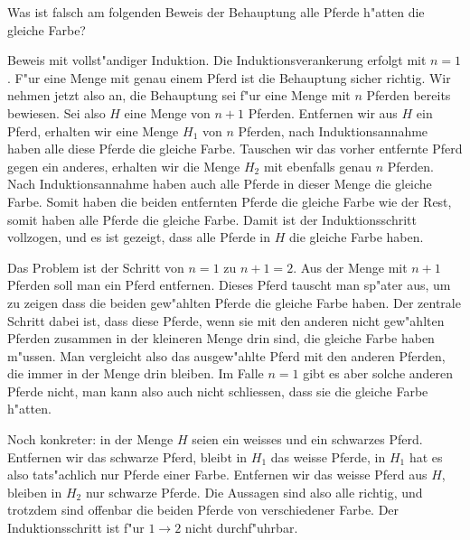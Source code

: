 Was ist falsch am folgenden Beweis der Behauptung alle Pferde h"atten die
gleiche Farbe?

Beweis mit vollst"andiger Induktion. Die Induktionsverankerung
erfolgt mit $n=1$. F"ur eine Menge mit genau einem Pferd ist
die Behauptung sicher richtig. Wir nehmen jetzt also an, die
Behauptung sei f"ur eine Menge mit $n$ Pferden bereits bewiesen.
Sei also $H$ eine Menge von $n+1$ Pferden. Entfernen wir aus $H$
ein Pferd, erhalten wir eine Menge $H_1$ von $n$ Pferden, nach
Induktionsannahme haben alle diese Pferde die gleiche Farbe.
Tauschen wir das vorher entfernte Pferd gegen ein anderes, erhalten
wir die Menge $H_2$ mit ebenfalls genau $n$ Pferden. Nach Induktionsannahme
haben auch alle Pferde in dieser Menge die gleiche Farbe. Somit
haben die beiden entfernten Pferde die gleiche Farbe wie der Rest,
somit haben alle Pferde die gleiche Farbe. Damit ist der Induktionsschritt
vollzogen, und es ist gezeigt, dass alle Pferde in $H$ die gleiche Farbe
haben.

\begin{loesung}
Das Problem ist der Schritt von $n=1$ zu $n+1=2$.
Aus der Menge mit $n+1$ Pferden soll man ein Pferd entfernen.
Dieses Pferd tauscht man sp"ater aus, um zu zeigen dass die
beiden gew"ahlten Pferde die gleiche Farbe haben. Der zentrale
Schritt dabei ist, dass diese Pferde, wenn sie mit den anderen nicht
gew"ahlten Pferden zusammen in der kleineren Menge drin sind,
die gleiche Farbe haben m"ussen. Man vergleicht also das ausgew"ahlte
Pferd mit den anderen Pferden, die immer in der Menge drin bleiben.
Im Falle $n=1$ gibt es aber solche
anderen Pferde nicht, man kann also auch nicht schliessen, dass
sie die gleiche Farbe h"atten.

Noch konkreter: in der Menge $H$ seien ein weisses und ein schwarzes Pferd.
Entfernen wir das schwarze Pferd, bleibt in $H_1$ das weisse Pferde,
in $H_1$ hat es also tats"achlich nur Pferde einer Farbe. Entfernen
wir das weisse Pferd aus $H$, bleiben in $H_2$ nur schwarze
Pferde. Die Aussagen sind also alle richtig, und trotzdem sind
offenbar die beiden Pferde von verschiedener Farbe. Der Induktionsschritt
ist f"ur $1\to 2$ nicht durchf"uhrbar.
\end{loesung}
